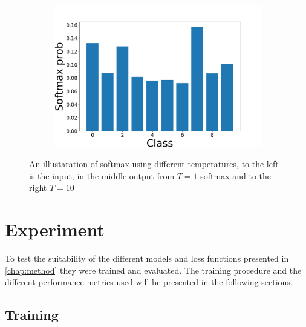 \documentclass{kththesis}
\begin{document}
\begin{figure}[h]
\begin{subfigure}[b]{0.3\textwidth}
        \includegraphics[width=\textwidth]{softmaxT10}
      \end{subfigure}
     \caption{An illustaration of softmax using different temperatures, to the
       left is the input, in the middle output from \(T=1\) softmax and to the
       right \(T = 10\)}\label{fig:softmax}
\end{figure}


\chapter{Experiment}
To test the suitability of the different models and loss functions presented in
\cref{chap:method} they were trained and evaluated. The training procedure and
the different performance metrics used will be presented in the following
sections.

\section{Training}

\end{document}
